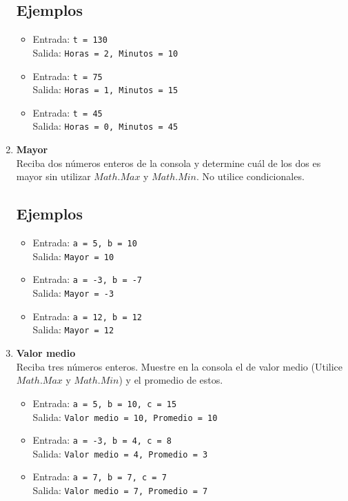 \begin{enumerate}
    \subsection*{Ejemplos}
    \begin{itemize}
    \item Entrada: \texttt{t = 130}\\
          Salida: \texttt{Horas = 2, Minutos = 10}
    \item Entrada: \texttt{t = 75}\\
          Salida: \texttt{Horas = 1, Minutos = 15}
    \item Entrada: \texttt{t = 45}\\
          Salida: \texttt{Horas = 0, Minutos = 45}
\end{itemize}
    
    \item \textbf{Mayor}\\
    Reciba dos números enteros de la consola y determine cuál de los dos es mayor sin utilizar $Math.Max$ y $Math.Min$. No utilice condicionales.
    \subsection*{Ejemplos}
    \begin{itemize}
    \item Entrada: \texttt{a = 5, b = 10}\\
          Salida: \texttt{Mayor = 10}
    \item Entrada: \texttt{a = -3, b = -7}\\
          Salida: \texttt{Mayor = -3}
    \item Entrada: \texttt{a = 12, b = 12}\\
          Salida: \texttt{Mayor = 12}
    \end{itemize}
    
    \item \textbf{Valor medio}\\
    Reciba tres números enteros. Muestre en la consola el de valor medio (Utilice $Math.Max$ y $Math.Min$) y el promedio de estos.
    \begin{itemize}
    \subsection*{Ejemplos}
    \item Entrada: \texttt{a = 5, b = 10, c = 15}\\
          Salida: \texttt{Valor medio = 10, Promedio = 10}
    \item Entrada: \texttt{a = -3, b = 4, c = 8}\\
          Salida: \texttt{Valor medio = 4, Promedio = 3}
    \item Entrada: \texttt{a = 7, b = 7, c = 7}\\
          Salida: \texttt{Valor medio = 7, Promedio = 7}
\end{itemize}
        

\end{enumerate}
